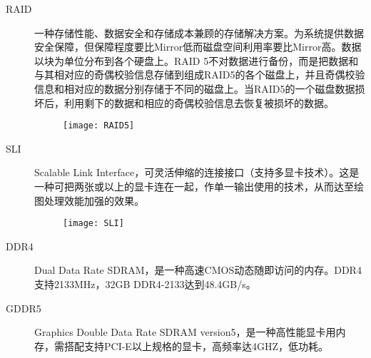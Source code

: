 \begin{description}
\item[RAID] 一种存储性能、数据安全和存储成本兼顾的存储解决方案。为系统提供数据安全保障，但保障程度要比Mirror低而磁盘空间利用率要比Mirror高。数据以块为单位分布到各个硬盘上。RAID 5不对数据进行备份，而是把数据和与其相对应的奇偶校验信息存储到组成RAID5的各个磁盘上，并且奇偶校验信息和相对应的数据分别存储于不同的磁盘上。当RAID5的一个磁盘数据损坏后，利用剩下的数据和相应的奇偶校验信息去恢复被损坏的数据。
\begin{figure}[!ht]
\centering
\texttt{[image: RAID5]}
\end{figure}

\item[SLI] Scalable Link Interface，可灵活伸缩的连接接口（支持多显卡技术）。这是一种可把两张或以上的显卡连在一起，作单一输出使用的技术，从而达至绘图处理效能加强的效果。
\begin{figure}[!ht]
\centering
\texttt{[image: SLI]}
\end{figure}

\item[DDR4] Dual Data Rate SDRAM，是一种高速CMOS动态随即访问的内存。DDR4支持2133MHz，32GB DDR4-2133达到48.4GB/s。

\item[GDDR5] Graphics Double Data Rate SDRAM version5，是一种高性能显卡用内存，需搭配支持PCI-E以上规格的显卡，高频率达4GHZ，低功耗。
\end{description}

